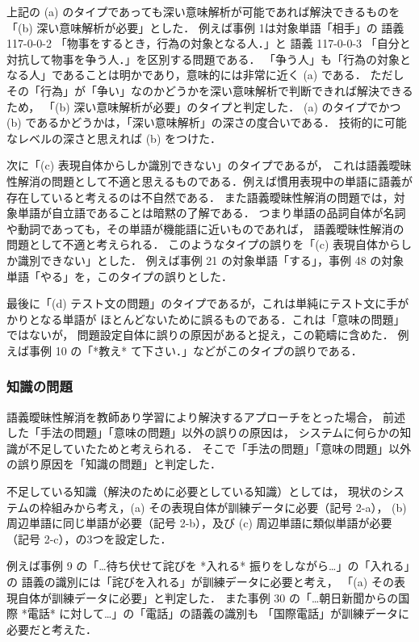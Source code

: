 \documentclass[japanese]{jnlp_1.4}
\begin{document}
上記の (a) のタイプであっても深い意味解析が可能であれば解決できるものを「(b) 深い意味解析が必要」とした．
例えば事例 1は対象単語「相手」の
語義 117-0-0-2 「物事をするとき，行為の対象となる人．」と
語義 117-0-0-3 「自分と対抗して物事を争う人．」を区別する問題である．
「争う人」も「行為の対象となる人」であることは明かであり，意味的には非常に近く (a) である．
ただしその「行為」が「争い」なのかどうかを深い意味解析で判断できれば解決できるため，
「(b) 深い意味解析が必要」のタイプと判定した．
(a) のタイプでかつ (b) であるかどうかは，「深い意味解析」の深さの度合いである．
技術的に可能なレベルの深さと思えれば (b) をつけた．

次に「(c) 表現自体からしか識別できない」のタイプであるが，
これは語義曖昧性解消の問題として不適と思えるものである．例えば慣用表現中の単語に語義が
存在していると考えるのは不自然である．
また語義曖昧性解消の問題では，対象単語が自立語であることは暗黙の了解である．
つまり単語の品詞自体が名詞や動詞であっても，その単語が機能語に近いものであれば，
語義曖昧性解消の問題として不適と考えられる．
このようなタイプの誤りを「(c) 表現自体からしか識別できない」とした．
例えば事例 21 の対象単語「する」，事例 48 の対象単語「やる」を，このタイプの誤りとした．

最後に「(d) テスト文の問題」のタイプであるが，これは単純にテスト文に手がかりとなる単語が
ほとんどないために誤るものである．これは「意味の問題」ではないが，
問題設定自体に誤りの原因があると捉え，この範疇に含めた．
例えば事例 10 の「*教え* て下さい．」などがこのタイプの誤りである．


\subsubsection{知識の問題}

語義曖昧性解消を教師あり学習により解決するアプローチをとった場合，
前述した「手法の問題」「意味の問題」以外の誤りの原因は，
システムに何らかの知識が不足していたためと考えられる．
そこで「手法の問題」「意味の問題」以外の誤り原因を「知識の問題」と判定した．

不足している知識（解決のために必要としている知識）としては，
現状のシステムの枠組みから考え，(a) その表現自体が訓練データに必要（記号 2-a），
(b) 周辺単語に同じ単語が必要（記号 2-b），及び (c) 周辺単語に類似単語が必要（記号 2-c），の3つを設定した．

例えば事例 9 の「…待ち伏せて詫びを *入れる* 振りをしながら…」の「入れる」の
語義の識別には「詫びを入れる」が訓練データに必要と考え，
「(a) その表現自体が訓練データに必要」と判定した．
また事例 30 の「…朝日新聞からの国際 *電話* に対して…」の「電話」の語義の識別も
「国際電話」が訓練データに必要だと考えた．
\end{document}
